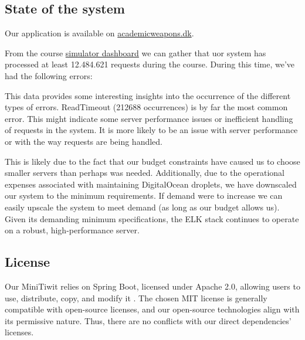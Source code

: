 \subsection{State of the system}
Our application is available on \href{https://academicweapons.dk/}{academicweapons.dk}. 

From the course \href{146.190.207.33:3000}{simulator dashboard} we can gather that uor system has processed at least 12.484.621 requests during the course. During this time, we've had the following errors:

\begin{center}
\end{center}
This data provides some interesting insights into the occurrence of the different types of errors. ReadTimeout (212688 occurrences) is by far the most common error. This might indicate some server performance issues or inefficient handling of requests in the system. It is more likely to be an issue with server performance or with the way requests are being handled. 

This is likely due to the fact that our budget constraints have caused us to choose smaller servers than perhaps was needed. Additionally, due to the operational expenses associated with maintaining DigitalOcean droplets, we have downscaled our system to the minimum requirements. If demand were to increase we can easily upscale the system to meet demand (as long as our budget allows us). Given its demanding minimum specifications, the ELK stack continues to operate on a robust, high-performance server. 


\subsection{License}
Our MiniTiwit relies on Spring Boot, licensed under Apache 2.0, allowing users to use, distribute, copy, and modify it \cite{license}. The chosen MIT license is generally compatible with open-source licenses, and our open-source technologies align with its permissive nature. Thus, there are no conflicts with our direct dependencies' licenses.